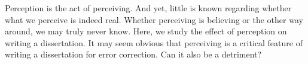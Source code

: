 
Perception is the act of perceiving.
And yet, little is known regarding whether what we perceive is indeed real.
Whether perceiving is believing or the other way around, we may truly never know.
Here, we study the effect of perception on writing a dissertation.
It may seem obvious that perceiving is a critical feature of writing a dissertation for error correction.
Can it also be a detriment?

